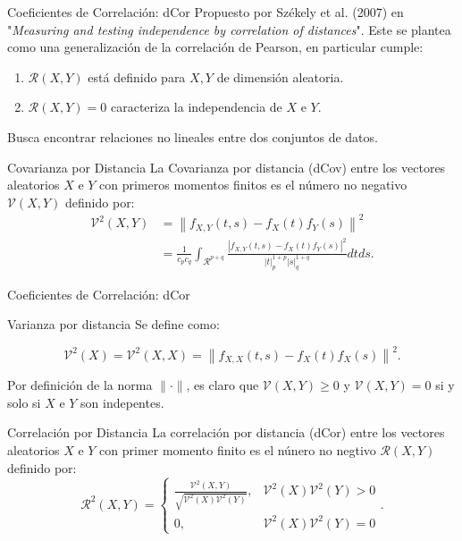 \documentclass{beamer}
\begin{document}
\begin{frame}{Coeficientes de Correlación: dCor}
     Propuesto por Székely et al. (2007) en  "\textit{Measuring and testing independence by correlation of distances}". Este se plantea como una generalizaci\'on de la correlaci\'on de Pearson, en particular cumple:
    \pause
    \begin{enumerate}
        \item $\mathcal{R}(X,Y)$ est\'a definido para $X,Y$ de dimensi\'on aleatoria.
        \pause
        \item $\mathcal{R}(X,Y) = 0$ caracteriza la independencia de $X$ e $Y$.
    \end{enumerate}
    \pause
    Busca encontrar relaciones no lineales entre dos conjuntos de datos.
    \pause
    \begin{block}{Covarianza por Distancia}
        La Covarianza por distancia (dCov) entre los vectores aleatorios $X$ e $Y$ con primeros momentos finitos es el n\'umero no negativo $\mathcal{V}(X, Y)$ definido por:
        \begin{equation*}
            \begin{aligned}\label{dcov_formula}
                \mathcal{V}^2(X, Y) & =\left\|f_{X, Y}(t, s)-f_X(t) f_Y(s)\right\|^2 \\
                & =\frac{1}{c_p c_q} \int_{\mathcal{R}^{p+q}} \frac{\left|f_{X, Y}(t, s)-f_X(t) f_Y(s)\right|^2}{|t|_p^{1+p}|s|_q^{1+q}} d t d s .
                \end{aligned}
        \end{equation*}
    \end{block}
\end{frame}


\begin{frame}{Coeficientes de Correlación: dCor}
    \begin{block}{Varianza por distancia}
        Se define como:

        $$
        \mathcal{V}^2(X)=\mathcal{V}^2(X, X)=\left\|f_{X, X}(t, s)-f_X(t) f_X(s)\right\|^2 .
        $$
        
    \end{block}
    \pause
    Por definici\'on de la norma $\|\cdot\|$, es claro que  $\mathcal{V}(X, Y) \geq 0$ y $\mathcal{V}(X, Y)=0$ si y solo si $X$ e $Y$ son indepentes.
    \pause
    \begin{block}{Correlaci\'on por Distancia}
        La correlaci\'on por distancia (dCor) entre los vectores aleatorios $X$ e $Y$ con primer momento finito es el n\'unero no negtivo $\mathcal{R}(X, Y)$ definido por:
		$$
		\mathcal{R}^2(X, Y)= \begin{cases}\frac{\mathcal{V}^2(X, Y)}{\sqrt{\mathcal{V}^2(X) \mathcal{V}^2(Y)}}, & \mathcal{V}^2(X) \mathcal{V}^2(Y)>0 \\ 0, & \mathcal{V}^2(X) \mathcal{V}^2(Y)=0\end{cases}.
		$$
    \end{block}
\end{frame}
\end{document}
